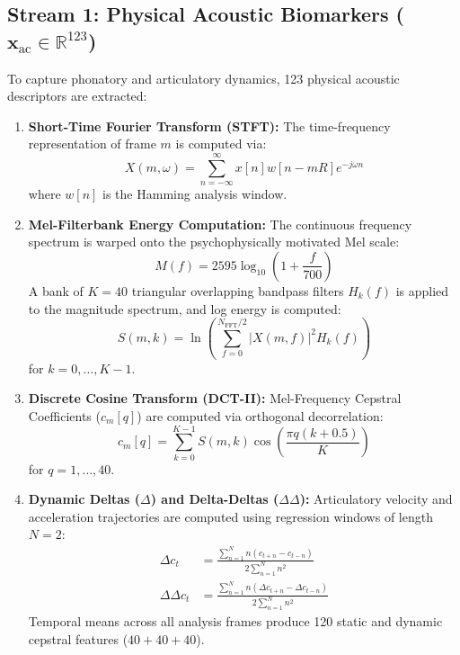 \documentclass[conference]{IEEEtran}
\begin{document}
\subsection{Stream 1: Physical Acoustic Biomarkers ($\mathbf{x}_{\text{ac}} \in \mathbb{R}^{123}$)}
To capture phonatory and articulatory dynamics, 123 physical acoustic descriptors are extracted:
\begin{enumerate}
    \item \textbf{Short-Time Fourier Transform (STFT):} The time-frequency representation of frame $m$ is computed via:
    \begin{equation}
    X(m, \omega) = \sum_{n=-\infty}^{\infty} x[n] w[n - mR] e^{-j \omega n}
    \label{eq:stft}
    \end{equation}
    where $w[n]$ is the Hamming analysis window.
    
    \item \textbf{Mel-Filterbank Energy Computation:} The continuous frequency spectrum is warped onto the psychophysically motivated Mel scale:
    \begin{equation}
    M(f) = 2595 \log_{10}\left(1 + \frac{f}{700}\right)
    \label{eq:mel_scale}
    \end{equation}
    A bank of $K = 40$ triangular overlapping bandpass filters $H_k(f)$ is applied to the magnitude spectrum, and log energy is computed:
    \begin{equation}
    S(m, k) = \ln \left( \sum_{f=0}^{N_{\text{FFT}}/2} |X(m, f)|^2 H_k(f) \right)
    \label{eq:mel_energy}
    \end{equation}
    for $k = 0, \dots, K-1$.

    \item \textbf{Discrete Cosine Transform (DCT-II):} Mel-Frequency Cepstral Coefficients ($c_m[q]$) are computed via orthogonal decorrelation:
    \begin{equation}
    c_m[q] = \sum_{k=0}^{K-1} S(m, k) \cos\left( \frac{\pi q (k + 0.5)}{K} \right)
    \label{eq:dct}
    \end{equation}
    for $q = 1, \dots, 40$.

    \item \textbf{Dynamic Deltas ($\Delta$) and Delta-Deltas ($\Delta\Delta$):} Articulatory velocity and acceleration trajectories are computed using regression windows of length $N = 2$:
    \begin{align}
    \Delta c_t &= \frac{\sum_{n=1}^N n (c_{t+n} - c_{t-n})}{2 \sum_{n=1}^N n^2} \label{eq:delta} \\
    \Delta\Delta c_t &= \frac{\sum_{n=1}^N n (\Delta c_{t+n} - \Delta c_{t-n})}{2 \sum_{n=1}^N n^2} \label{eq:deltadelta}
    \end{align}
    Temporal means across all analysis frames produce 120 static and dynamic cepstral features ($40 + 40 + 40$).


\end{enumerate}
\end{document}
